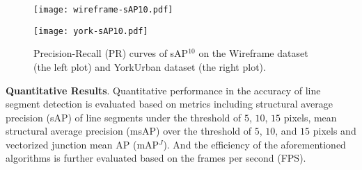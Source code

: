 \documentclass[letterpaper, 10 pt, conference]{ieeeconf}
\begin{document}
\begin{table}[h]
	\caption{{\color{black}Quantitative results and comparisons on the Wireframe dataset and YorkUrban dataset.}}
	\centering
	\label{tab:1}
\end{table} 
\begin{figure}[h!] 
	\centering
	\begin{minipage}[t]{0.49\linewidth}
		\centering
		\texttt{[image: wireframe-sAP10.pdf]} 
		\label{fig:5a}
	\end{minipage}
	\begin{minipage}[t]{0.49\linewidth}
		\centering
		\texttt{[image: york-sAP10.pdf]}
		\label{fig:5b}
	\end{minipage}
	\caption{Precision-Recall (PR) curves of sAP$^{10}$ on the Wireframe dataset (the left plot) and YorkUrban dataset (the right plot).}
	\label{fig:5}
\end{figure}
\noindent \textbf{Quantitative Results}. Quantitative performance in the accuracy of line segment detection is evaluated based on metrics including structural average precision (sAP) of line segments under the threshold of $5$, $10$, $15$ pixels, mean structural average precision (msAP) over the threshold of $5$, $10$, and $15$ pixels and vectorized junction mean AP (mAP$^J$). And the efficiency of the aforementioned algorithms is further evaluated based on the frames per second (FPS). 
\end{document}
